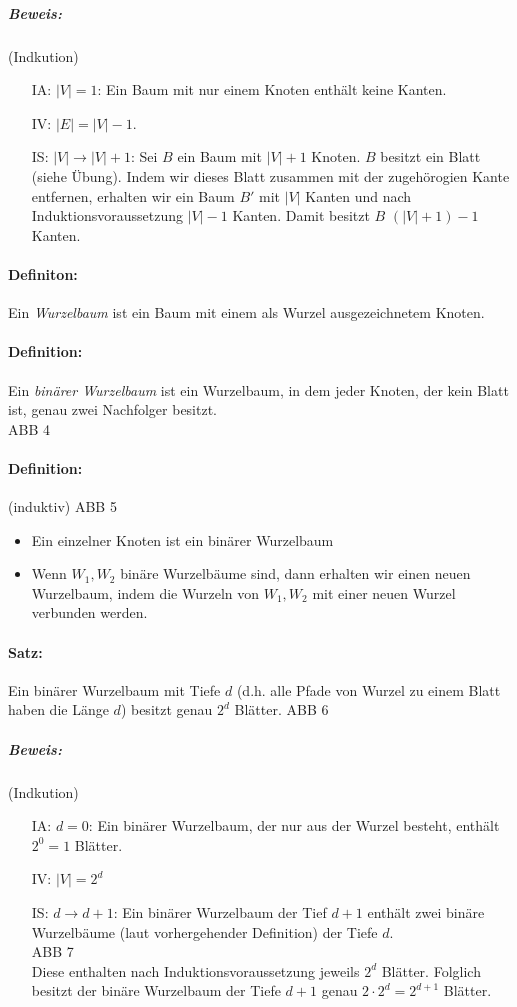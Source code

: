 \subparagraph{Beweis:} (Indkution)
\begin{itemize}
\item[IA:] $|V|=1$: Ein Baum mit nur einem Knoten enthält keine Kanten.
\item[IV:] $|E|=|V|-1$.
\item[IS:]$|V| \rightarrow |V| +1$: Sei $B$ ein Baum mit $|V|+1$ Knoten. $B$ besitzt ein Blatt (siehe Übung). Indem wir dieses Blatt zusammen mit der zugehörogien Kante entfernen, erhalten wir ein Baum $B'$ mit $|V|$ Kanten und nach Induktionsvoraussetzung $|V|-1$ Kanten. Damit besitzt $B$ $(|V|+1)-1$ Kanten.
\end{itemize}

\paragraph{Definiton:} Ein \emph{Wurzelbaum} ist ein Baum mit einem als Wurzel ausgezeichnetem Knoten.

\paragraph{Definition:} Ein \emph{binärer Wurzelbaum} ist ein Wurzelbaum, in dem jeder Knoten, der kein Blatt ist, genau zwei Nachfolger besitzt.\\
ABB 4
\paragraph{Definition:}  (induktiv)
ABB 5
\begin{itemize}
\item Ein einzelner Knoten ist ein binärer Wurzelbaum
\item Wenn $W_1, W_2$ binäre Wurzelbäume sind, dann erhalten wir einen neuen Wurzelbaum, indem die Wurzeln von $W_1,W_2$ mit einer neuen Wurzel verbunden werden.
\end{itemize}
\paragraph{Satz:} Ein binärer Wurzelbaum mit Tiefe $d$ (d.h. alle Pfade von Wurzel zu einem Blatt haben die Länge $d$) besitzt genau $2^d$ Blätter.
ABB 6
\subparagraph{Beweis:} (Indkution)
\begin{itemize}
\item[IA:] $d=0$: Ein binärer Wurzelbaum, der nur aus der Wurzel besteht, enthält $2^0=1$ Blätter.
\item[IV:] $|V| =2^d$
\item[IS:] $d\rightarrow d+1$: Ein binärer Wurzelbaum der Tief $d+1$ enthält zwei binäre Wurzelbäume (laut vorhergehender Definition) der Tiefe $d$.\\
ABB 7\\
Diese enthalten nach Induktionsvoraussetzung jeweils $2^d$ Blätter. Folglich besitzt der binäre Wurzelbaum der Tiefe $d+1$ genau $2\cdot 2^d=2^{d+1}$ Blätter.
\end{itemize}

